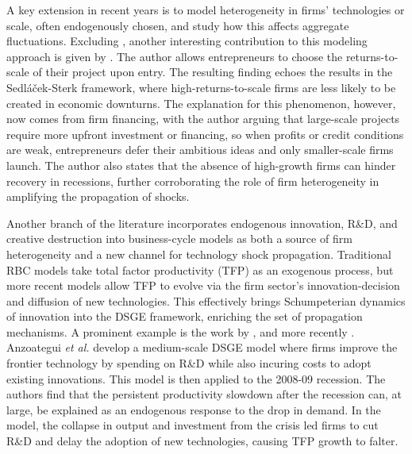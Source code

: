\documentclass[a4paper,12pt]{article} %
\numberwithin{equation}{section} %
\numberwithin{figure}{section}
\numberwithin{table}{section}
\begin{document}
A key extension in recent years is to model heterogeneity in firms' technologies or scale, often endogenously chosen, and study how this 
affects aggregate fluctuations. Excluding \textcite{sedlavcek2017growth}, another interesting contribution to this modeling approach is given 
by \textcite{smirnyagin2023returns}. The author allows entrepreneurs to choose the returns-to-scale of their project upon entry. The resulting 
finding echoes the results in the Sedláček-Sterk framework, where high-returns-to-scale firms are less likely to be created in economic downturns.
The explanation for this phenomenon, however, now comes from firm financing, with the author arguing that large-scale projects require more 
upfront investment or financing, so when profits or credit conditions are weak, entrepreneurs defer their ambitious ideas and only smaller-scale 
firms launch. The author also states that the absence of high-growth firms can hinder recovery in recessions, further corroborating the role of 
firm heterogeneity in amplifying the propagation of shocks.

Another branch of the literature incorporates endogenous innovation, R\&D, and creative destruction into business-cycle models as both a source of firm heterogeneity and a 
new channel for technology shock propagation. Traditional RBC models take total factor productivity (TFP) as an exogenous process, but more recent models allow TFP to evolve via 
the firm sector's innovation-decision and diffusion of new technologies. This effectively brings Schumpeterian dynamics of innovation into the DSGE framework, enriching the 
set of propagation mechanisms.  A prominent example is the work by \textcite{comin2006medium}, and more recently \textcite{anzoategui2019endogenous}. Anzoategui \textit{et al.} 
develop a medium-scale DSGE model where firms improve the frontier technology by spending on R\&D while also incuring costs to adopt existing innovations. 
This model is then applied to the 2008-09 recession. 
The authors find that the persistent productivity slowdown after the recession can, at large, be explained as an endogenous response to the drop in demand. In the model, the collapse in output 
and investment from the crisis led firms to cut R\&D and delay the adoption of new technologies, causing TFP growth to falter.
\end{document}
